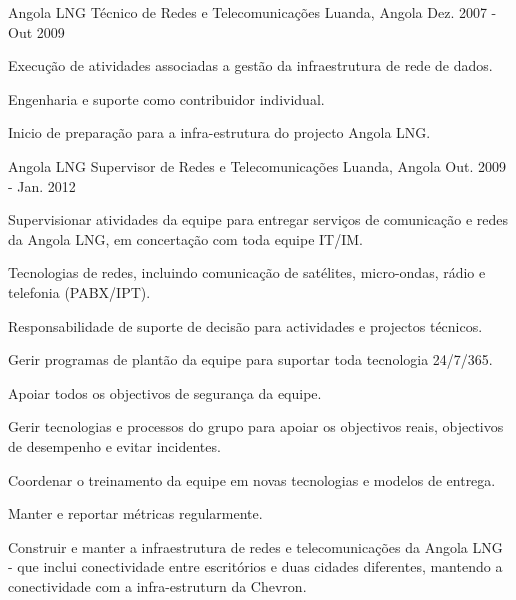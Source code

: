 \begin{cventries}

\cventry
{Angola LNG} %
{Técnico de Redes e Telecomunicações} %
{Luanda, Angola} %
{Dez. 2007 - Out 2009} %
{ %
\begin{cvitems}
\item {Execução de atividades associadas a gestão da infraestrutura de rede de dados.}
\item {Engenharia e suporte como contribuidor individual.}
\item {Inicio de preparação para a infra-estrutura do projecto Angola LNG.}
\end{cvitems}
}


\cventry
{Angola LNG} %
{Supervisor de Redes e Telecomunicações} %
{Luanda, Angola} %
{Out. 2009 - Jan. 2012} %
{ %
\begin{cvitems}
\item {Supervisionar atividades da equipe para entregar serviços de comunicação e redes da Angola LNG, em concertação com toda equipe IT/IM.}
\item {Tecnologias de redes, incluindo comunicação de satélites, micro-ondas, rádio e telefonia (PABX/IPT).}
\item {Responsabilidade de suporte de decisão para actividades e projectos técnicos.}
\item {Gerir programas de plantão da equipe para suportar toda tecnologia 24/7/365.}
\item {Apoiar todos os objectivos de segurança da equipe.}
\item {Gerir tecnologias e processos do grupo para apoiar os objectivos reais, objectivos de desempenho e evitar incidentes.}
\item {Coordenar o treinamento da equipe em novas tecnologias e modelos de entrega.}
\item {Manter e reportar métricas regularmente.}
\item {Construir e manter a infraestrutura de redes e telecomunicações da Angola LNG - que inclui conectividade entre escritórios e duas cidades diferentes, mantendo a conectividade com a infra-estruturn da Chevron.}
\end{cvitems} 
}



\end{cventries}
